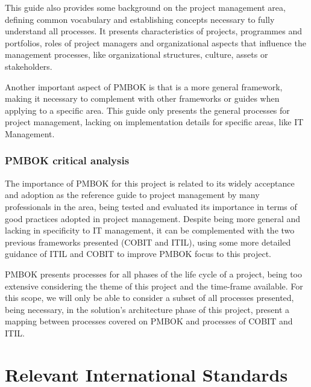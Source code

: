 This guide also provides some background on the project management area, defining common vocabulary and establishing concepts necessary to fully understand all processes. It presents characteristics of projects, programmes and portfolios, roles of project managers and organizational aspects that influence the management processes, like organizational structures, culture, assets or stakeholders.\par 
Another important aspect of PMBOK is that is a more general framework, making it necessary to complement with other frameworks or guides when applying to a specific area. This guide only presents the general processes for project management, lacking on implementation details for specific areas, like IT Management.\par 

\subsubsection{PMBOK critical analysis}

The importance of PMBOK for this project is related to its widely acceptance and adoption as the reference guide to project management by many professionals in the area, being tested and evaluated its importance in terms of good practices adopted in project management. Despite being more general and lacking in specificity to IT management, it can be complemented with the two previous frameworks presented (COBIT and ITIL), using some more detailed guidance of ITIL and COBIT to improve PMBOK focus to this project.\par
PMBOK presents processes for all phases of the life cycle of a project, being too extensive considering the theme of this project and the time-frame available. For this scope, we will only be able to consider a subset of all processes presented, being necessary, in the solution's architecture phase of this project, present a mapping between processes covered on PMBOK and processes of COBIT and ITIL.


\section{Relevant International Standards}

